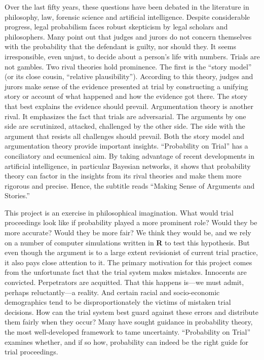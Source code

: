 \documentclass[
  10pt,
  dvipsnames,enabledeprecatedfontcommands]{scrartcl}
\begin{document}
Over the last fifty years, these questions have been debated in the
literature in philosophy, law, forensic science and artificial
intelligence. Despite considerable progress, legal probabilism faces
robust skepticism by legal scholars and philosophers. Many point out
that judges and jurors do not concern themselves with the probability
that the defendant is guilty, nor should they. It seems irresponsible,
even unjust, to decide about a person's life with numbers. Trials are
not gambles. Two rival theories hold prominence. The first is the
``story model'' (or its close cousin, ``relative plausibility'').
According to this theory, judges and jurors make sense of the evidence
presented at trial by constructing a unifying story or account of what
happened and how the evidence got there. The story that best explains
the evidence should prevail. Argumentation theory is another rival. It
emphasizes the fact that trials are adversarial. The arguments by one
side are scrutinized, attacked, challenged by the other side. The side
with the argument that resists all challenges should prevail. Both the
story model and argumentation theory provide important insights.
``Probability on Trial'' has a conciliatory and ecumenical aim. By
taking advantage of recent developments in artificial intelligence, in
particular Bayesian networks, it shows that probability theory can
factor in the insights from its rival theories and make them more
rigorous and precise. Hence, the subtitle reads ``Making Sense of
Arguments and Stories.''

This project is an exercise in philosophical imagination. What would
trial proceedings look like if probability played a more prominent role?
Would they be more accurate? Would they be more fair? We think they
would be, and we rely on a number of computer simulations written in
\textbf{\textsf{R}} to test this hypothesis. But even though the
argument is to a large extent revisionist of current trial practice, it
also pays close attention to it. The primary motivation for this project
comes from the unfortunate fact that the trial system makes mistakes.
Innocents are convicted. Perpetrators are acquitted. That this happens
is---we must admit, perhaps reluctantly---a reality. And certain racial
and socio-economic demographics tend to be disproportionately the
victims of mistaken trial decisions. How can the trial system best guard
against these errors and distribute them fairly when they occur? Many
have sought guidance in probability theory, the most well-developed
framework to tame uncertainty. ``Probability on Trial'' examines
whether, and if so how, probability can indeed be the right guide for
trial proceedings.
\end{document}
